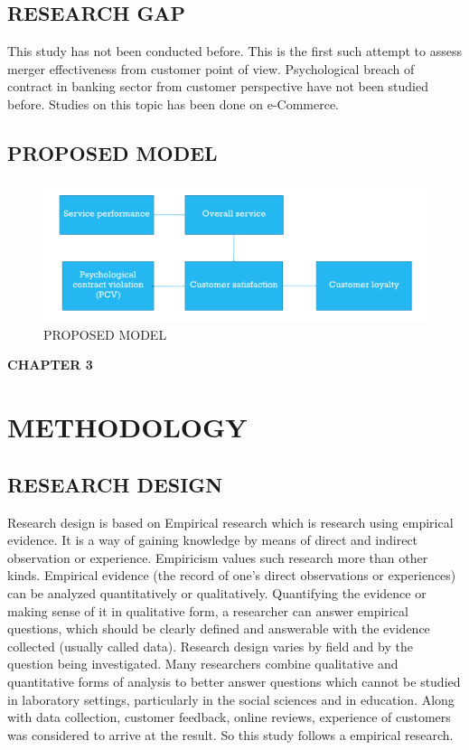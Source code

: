 \documentclass[a4paper, 12pt]{extarticle}
\begin{document}
{\subsection{RESEARCH GAP}
This study has not been conducted before. This is the first such attempt to assess merger effectiveness from customer point of view. Psychological breach of contract in banking sector from customer perspective have not been studied before. Studies on this topic has been done on e-Commerce.

\subsection{PROPOSED MODEL}
\begin{figure}[H]
\centering
\includegraphics[scale=0.5]{model.png}
\caption {PROPOSED MODEL}
\end{figure}

\newpage
\begin{center}
\textbf{\large CHAPTER 3}
\end{center}
\section{METHODOLOGY}
\subsection{RESEARCH DESIGN}
Research design is based on Empirical research  which is research using empirical evidence. It is a way of gaining knowledge by means of direct and indirect observation or experience. Empiricism values such research more than other kinds. Empirical evidence (the record of one's direct observations or experiences) can be analyzed quantitatively or qualitatively. Quantifying the evidence or making sense of it in qualitative form, a researcher can answer empirical questions, which should be clearly defined and answerable with the evidence collected (usually called data). Research design varies by field and by the question being investigated. Many researchers combine qualitative and quantitative forms of analysis to better answer questions which cannot be studied in laboratory settings, particularly in the social sciences and in education. Along with data collection,  customer feedback, online reviews, experience of customers was considered to arrive at the result. So this study follows a empirical research.

}
\end{document}
